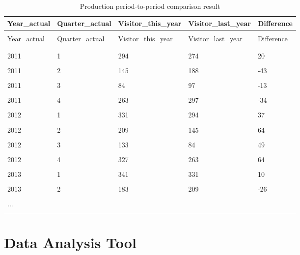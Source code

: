 \documentclass[letterpaper,12pt]{article}
\begin{document}
\begingroup
\renewcommand\arraystretch{0.5}
\begin{longtable}{p{2.5cm}p{3cm}p{3cm}p{3cm}p{2cm}}
        \caption{Production period-to-period comparison result} \\
	Year\_actual & Quarter\_actual & Visitor\_this\_year & Visitor\_last\_year & Difference \\
        \endfirsthead \\
        Year\_actual & Quarter\_actual & Visitor\_this\_year & Visitor\_last\_year & Difference \\
        \endhead \\
        \hline \\
        2011 & 1 & 294 & 274 & 20 \\
        \hline \\
        2011 & 2 & 145 & 188 & -43 \\
        \hline \\
        2011 & 3 & 84 & 97 & -13 \\
        \hline \\
        2011 & 4 & 263 & 297 & -34 \\
        \hline \\
        2012 & 1 & 331 & 294 & 37 \\
        \hline \\
        2012 & 2 & 209 & 145 & 64 \\
        \hline \\
        2012 & 3 & 133 & 84 & 49 \\
        \hline \\
        2012 & 4 & 327 & 263 & 64 \\
        \hline \\
        2013 & 1 & 341 & 331 & 10 \\
        \hline \\
        2013 & 2 & 183 & 209 & -26 \\
        \hline \\
        ... & & & \\
        \hline \\
\end{longtable}
\endgroup

\section{Data Analysis Tool}
\end{document}
